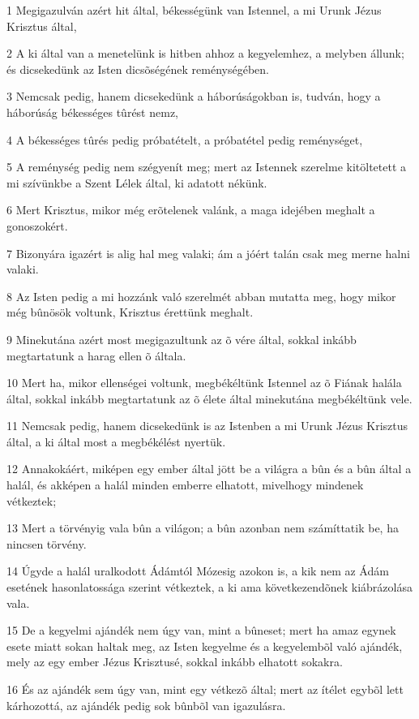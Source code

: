 \par 1 Megigazulván azért hit által, békességünk van Istennel, a mi Urunk Jézus Krisztus által,
\par 2 A ki által van a menetelünk is hitben ahhoz a kegyelemhez, a melyben állunk; és dicsekedünk az Isten dicsõségének reménységében.
\par 3 Nemcsak pedig, hanem dicsekedünk a háborúságokban is, tudván, hogy a háborúság békességes tûrést nemz,
\par 4 A békességes tûrés pedig próbatételt, a próbatétel pedig reménységet,
\par 5 A reménység pedig nem szégyenít meg; mert az Istennek szerelme kitöltetett a mi szívünkbe a Szent Lélek által, ki adatott nékünk.
\par 6 Mert Krisztus, mikor még erõtelenek valánk, a maga idejében meghalt a gonoszokért.
\par 7 Bizonyára igazért is alig hal meg valaki; ám a jóért talán csak meg merne halni valaki.
\par 8 Az Isten pedig a mi hozzánk való szerelmét abban mutatta meg, hogy mikor még bûnösök voltunk, Krisztus érettünk meghalt.
\par 9 Minekutána azért most megigazultunk az õ vére által, sokkal inkább megtartatunk a harag ellen õ általa.
\par 10 Mert ha, mikor ellenségei voltunk, megbékéltünk Istennel az õ Fiának halála által, sokkal inkább megtartatunk az õ élete által minekutána megbékéltünk vele.
\par 11 Nemcsak pedig, hanem dicsekedünk is az Istenben a mi Urunk Jézus Krisztus által, a ki által most a megbékélést nyertük.
\par 12 Annakokáért, miképen egy ember által jött be a világra a bûn és a bûn által a halál, és akképen a halál minden emberre elhatott, mivelhogy mindenek vétkeztek;
\par 13 Mert a törvényig vala bûn a világon; a bûn azonban nem számíttatik be, ha nincsen törvény.
\par 14 Úgyde a halál uralkodott Ádámtól Mózesig azokon is, a kik nem az Ádám esetének hasonlatossága szerint vétkeztek, a ki ama következendõnek kiábrázolása vala.
\par 15 De a kegyelmi ajándék nem úgy van, mint a bûneset; mert ha amaz egynek esete miatt sokan haltak meg, az Isten kegyelme és a kegyelembõl való ajándék, mely az egy ember Jézus Krisztusé, sokkal inkább elhatott sokakra.
\par 16 És az ajándék sem úgy van, mint egy vétkezõ által; mert az ítélet egybõl lett kárhozottá, az ajándék pedig sok bûnbõl van igazulásra.
